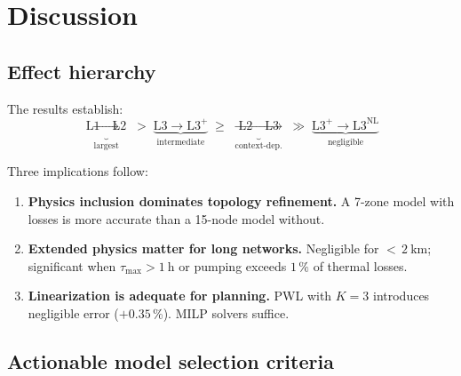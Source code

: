 \documentclass[review,3p]{elsarticle}
\newcommand{\Lplus}{\mathrm{L3}^{+}}
\newcommand{\Lnl}{\mathrm{L3}^{\mathrm{NL}}}
\begin{document}
\section{Discussion}
\label{sec:discussion}

\subsection{Effect hierarchy}
\label{sec:disc_hierarchy}

The results establish:
%
\begin{equation*}
  \underbrace{\text{L1} \to \text{L2}}_{\text{largest}}
  \;>\;
  \underbrace{\text{L3} \to \Lplus}_{\text{intermediate}}
  \;\geq\;
  \underbrace{\text{L2} \to \text{L3}}_{\text{context-dep.}}
  \;\gg\;
  \underbrace{\Lplus \to \Lnl}_{\text{negligible}}
\end{equation*}

Three implications follow:
%
\begin{enumerate}
  \item \textbf{Physics inclusion dominates topology refinement.}
        A 7-zone model with losses is more accurate than a 15-node
        model without.
  \item \textbf{Extended physics matter for long networks.}
        Negligible for ${<}\,\SI{2}{\kilo\metre}$; significant when
        $\tau_{\max} > \SI{1}{\hour}$ or pumping exceeds
        $1\,\%$ of thermal losses.
  \item \textbf{Linearization is adequate for planning.}
        PWL with $K=3$ introduces negligible error ($+0.35$\,\%). MILP solvers
        suffice.
\end{enumerate}

\subsection{Actionable model selection criteria}
\label{sec:disc_criteria}
\end{document}
